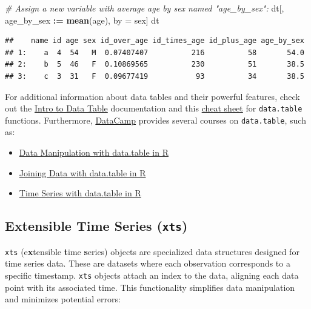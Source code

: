 \documentclass[
]{book}
\newenvironment{Shaded}{\begin{snugshade}}{\end{snugshade}}
\newcommand{\CommentTok}[1]{\textcolor[rgb]{0.56,0.35,0.01}{\textit{#1}}}
\newcommand{\FunctionTok}[1]{\textcolor[rgb]{0.13,0.29,0.53}{\textbf{#1}}}
\newcommand{\NormalTok}[1]{#1}
\newcommand{\OtherTok}[1]{\textcolor[rgb]{0.56,0.35,0.01}{#1}}
\newcommand{\SpecialCharTok}[1]{\textcolor[rgb]{0.81,0.36,0.00}{\textbf{#1}}}
\providecommand{\tightlist}{%
  \setlength{\itemsep}{0pt}\setlength{\parskip}{0pt}}
\begin{document}
\begin{Shaded}
\begin{Highlighting}[]
\CommentTok{\# Assign a new variable with average age by sex named "age\_by\_sex":}
\NormalTok{dt[, age\_by\_sex }\SpecialCharTok{:=} \FunctionTok{mean}\NormalTok{(age), by }\OtherTok{=}\NormalTok{ sex]}
\NormalTok{dt}
\end{Highlighting}
\end{Shaded}

\begin{verbatim}
##    name id age sex id_over_age id_times_age id_plus_age age_by_sex
## 1:    a  4  54   M  0.07407407          216          58       54.0
## 2:    b  5  46   F  0.10869565          230          51       38.5
## 3:    c  3  31   F  0.09677419           93          34       38.5
\end{verbatim}

For additional information about data tables and their powerful features, check out the \href{https://cran.r-project.org/web/packages/data.table/vignettes/datatable-intro.html}{Intro to Data Table} documentation and this \href{https://s3.amazonaws.com/assets.datacamp.com/blog_assets/datatable_Cheat_Sheet_R.pdf}{cheat sheet} for \texttt{data.table} functions. Furthermore, \href{https://learn.datacamp.com/}{DataCamp} provides several courses on \texttt{data.table}, such as:

\begin{itemize}
\tightlist
\item
  \href{https://learn.datacamp.com/courses/data-manipulation-with-datatable-in-r}{Data Manipulation with data.table in R}
\item
  \href{https://learn.datacamp.com/courses/joining-data-with-datatable-in-r}{Joining Data with data.table in R}
\item
  \href{https://learn.datacamp.com/courses/time-series-with-datatable-in-r}{Time Series with data.table in R}
\end{itemize}

\hypertarget{extensible-time-series-xts}{%
\subsection{\texorpdfstring{Extensible Time Series (\texttt{xts})}{Extensible Time Series (xts)}}\label{extensible-time-series-xts}}

\texttt{xts} (e\textbf{x}tensible \textbf{t}ime \textbf{s}eries) objects are specialized data structures designed for time series data. These are datasets where each observation corresponds to a specific timestamp. \texttt{xts} objects attach an index to the data, aligning each data point with its associated time. This functionality simplifies data manipulation and minimizes potential errors:
\end{document}
